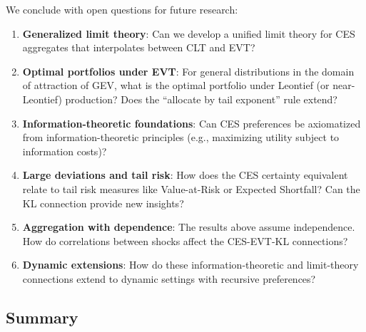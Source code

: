 We conclude with open questions for future research:

\begin{enumerate}[label=\textbf{Q\arabic*.}]
\item \textbf{Generalized limit theory}: Can we develop a unified limit theory for CES aggregates that interpolates between CLT and EVT?

\item \textbf{Optimal portfolios under EVT}: For general distributions in the domain of attraction of GEV, what is the optimal portfolio under Leontief (or near-Leontief) production? Does the ``allocate by tail exponent'' rule extend?

\item \textbf{Information-theoretic foundations}: Can CES preferences be axiomatized from information-theoretic principles (e.g., maximizing utility subject to information costs)?

\item \textbf{Large deviations and tail risk}: How does the CES certainty equivalent relate to tail risk measures like Value-at-Risk or Expected Shortfall? Can the KL connection provide new insights?

\item \textbf{Aggregation with dependence}: The results above assume independence. How do correlations between shocks affect the CES-EVT-KL connections?

\item \textbf{Dynamic extensions}: How do these information-theoretic and limit-theory connections extend to dynamic settings with recursive preferences?
\end{enumerate}

\subsection{Summary}
\label{subsec:ac-adv-summary}

